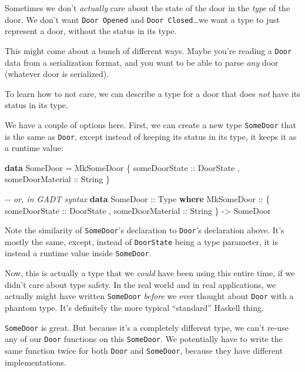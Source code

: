 \documentclass[]{article}
\newenvironment{Shaded}{}{}
\newcommand{\CommentTok}[1]{\textcolor[rgb]{0.38,0.63,0.69}{\textit{#1}}}
\newcommand{\DataTypeTok}[1]{\textcolor[rgb]{0.56,0.13,0.00}{#1}}
\newcommand{\KeywordTok}[1]{\textcolor[rgb]{0.00,0.44,0.13}{\textbf{#1}}}
\newcommand{\NormalTok}[1]{#1}
\newcommand{\OtherTok}[1]{\textcolor[rgb]{0.00,0.44,0.13}{#1}}
\begin{document}
Sometimes we don't \emph{actually} care about the state of the door in the
\emph{type} of the door. We don't want \texttt{Door\ \textquotesingle{}Opened}
and \texttt{Door\ \textquotesingle{}Closed}\ldots we want a type to just
represent a door, without the status in its type.

This might come about a bunch of different ways. Maybe you're reading a
\texttt{Door} data from a serialization format, and you want to be able to parse
\emph{any} door (whatever door is serialized).

To learn how to not care, we can describe a type for a door that does \emph{not}
have its status in its type.

We have a couple of options here. First, we can create a new type
\texttt{SomeDoor} that is the same as \texttt{Door}, except instead of keeping
its status in its type, it keeps it as a runtime value:

\begin{Shaded}
\begin{Highlighting}[]
\KeywordTok{data} \DataTypeTok{SomeDoor} \OtherTok{=} \DataTypeTok{MkSomeDoor}
\NormalTok{    \{}\OtherTok{ someDoorState    ::} \DataTypeTok{DoorState}
\NormalTok{    ,}\OtherTok{ someDoorMaterial ::} \DataTypeTok{String}
\NormalTok{    \}}

\CommentTok{{-}{-} or, in GADT syntax}
\KeywordTok{data} \DataTypeTok{SomeDoor}\OtherTok{ ::} \DataTypeTok{Type} \KeywordTok{where}
    \DataTypeTok{MkSomeDoor} \OtherTok{::}
\NormalTok{      \{}\OtherTok{ someDoorState    ::} \DataTypeTok{DoorState}
\NormalTok{      ,}\OtherTok{ someDoorMaterial ::} \DataTypeTok{String}
\NormalTok{      \} }\OtherTok{{-}\textgreater{}} \DataTypeTok{SomeDoor}
\end{Highlighting}
\end{Shaded}

Note the similarity of \texttt{SomeDoor}'s declaration to \texttt{Door}'s
declaration above. It's mostly the same, except, instead of \texttt{DoorState}
being a type parameter, it is instead a runtime value inside \texttt{SomeDoor}.

Now, this is actually a type that we \emph{could} have been using this entire
time, if we didn't care about type safety. In the real world and in real
applications, we actually might have written \texttt{SomeDoor} \emph{before} we
ever thought about \texttt{Door} with a phantom type. It's definitely the more
typical ``standard'' Haskell thing.

\texttt{SomeDoor} is great. But because it's a completely different type, we
can't re-use any of our \texttt{Door} functions on this \texttt{SomeDoor}. We
potentially have to write the same function twice for both \texttt{Door} and
\texttt{SomeDoor}, because they have different implementations.
\end{document}
